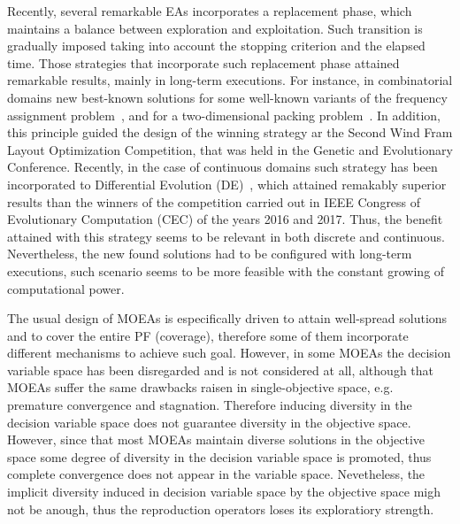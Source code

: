Recently, several remarkable EAs incorporates a replacement phase, which maintains a balance between exploration and exploitation.
%
Such transition is gradually imposed taking into account the stopping criterion and the elapsed time.
%
Those strategies that incorporate such replacement phase attained remarkable results, mainly in long-term executions.
%
For instance, in combinatorial domains new best-known solutions for some well-known variants of the frequency assignment problem~\cite{segura2016improving}, and for a two-dimensional packing problem~\cite{de2010optimisation}.
%
In addition, this principle guided the design of the winning strategy ar the Second Wind Fram Layout Optimization Competition, that was held in the Genetic and Evolutionary Conference.
%
Recently, in the case of continuous domains such strategy has been incorporated to Differential Evolution (DE)~\cite{castillo2019differential}, which attained remakably superior results than the winners of the competition carried out in IEEE Congress of Evolutionary Computation (CEC) of the years 2016 and 2017.
%
Thus, the benefit attained with this strategy seems to be relevant in both discrete and continuous.
%
Nevertheless, the new found solutions had to be configured with long-term executions, such scenario seems to be more feasible with the constant growing of computational power.
%

The usual design of MOEAs is especifically driven to attain well-spread solutions and to cover the entire PF (coverage), therefore some of them incorporate different mechanisms to achieve such goal.
%
However, in some MOEAs the decision variable space has been disregarded and is not considered at all, although that MOEAs suffer the same drawbacks raisen in single-objective space, e.g. premature convergence and stagnation.
%
Therefore inducing diversity in the decision variable space does not guarantee diversity in the objective space.
%
%
However, since that most MOEAs maintain diverse solutions in the objective space some degree of diversity in the decision variable space is promoted, thus complete convergence does not appear in the variable space.
%
Nevetheless, the implicit diversity induced in decision variable space by the objective space migh not be anough, thus the reproduction operators loses its exploratiory strength.
%

